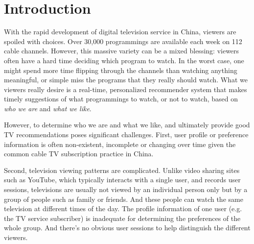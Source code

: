 \section{Introduction}
\label{sec:intro}
With the rapid development of digital television service
in China, viewers are spoiled with choices. 
Over 30,000 programmings are available each week 
on 112 cable channels. 
However, this massive variety can be a mixed blessing:
viewers often have a hard time deciding which program
to watch. In the worst case, one might spend more time
flipping through the channels than watching anything
meaningful, or simple miss the programs that they really
should watch. 
What we viewers really desire is a real-time, personalized
recommender system that makes timely suggestions of 
what programmings to watch, or not to watch,
based on {\em who we are} and {\em what we like}.
 


However, to determine who we are and what we like, and ultimately
provide good TV recommendations poses significant challenges.
First, user profile or preference information is 
often non-existent, incomplete or changing over time given
the common cable TV subscription practice in China. 

Second, television viewing patterns are complicated. Unlike
video sharing sites such as YouTube, which typically
interacts with a single user, and records user sessions,
televisions are usually not viewed by an
individual person only but by a group of people such as
family or friends. And these people can watch the same television
at different times of the day. The profile information of 
one user (e.g. the TV service subscriber) is inadequate 
for determining the preferences of the whole group.
And there's no obvious user sessions to help 
distinguish the different viewers.

